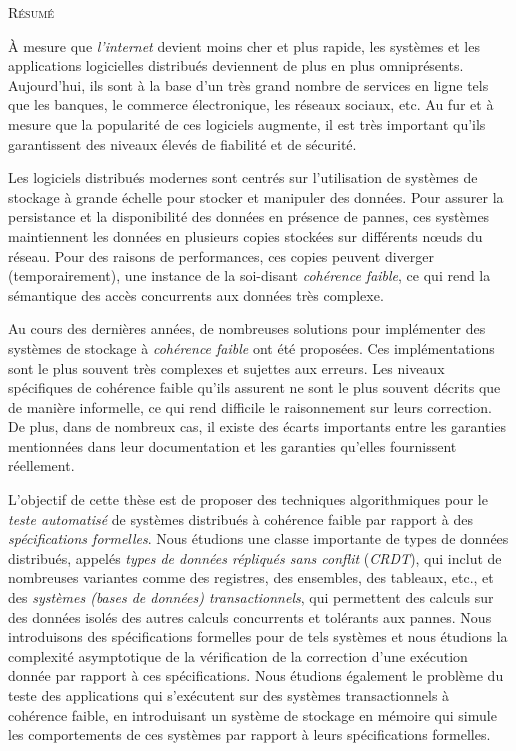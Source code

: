 
\begin{center}
  \textsc{Résumé}
\end{center}
%
\noindent
%


À mesure que \emph{l'internet} devient moins cher et plus rapide, les systèmes et les applications logicielles distribués deviennent de plus en plus omniprésents.
Aujourd'hui, ils sont à la base d'un très grand nombre de services en ligne tels que les banques, le commerce électronique, les réseaux sociaux, etc.
Au fur et à mesure que la popularité de ces logiciels augmente, il est très important qu'ils garantissent des niveaux élevés de fiabilité et de sécurité.

Les logiciels distribués modernes sont centrés sur l'utilisation de systèmes de stockage à grande échelle pour stocker et manipuler des données.
Pour assurer la persistance et la disponibilité des données en présence de pannes, ces systèmes maintiennent les données
en plusieurs copies stockées sur différents nœuds du réseau. Pour des raisons de performances, ces copies
peuvent diverger (temporairement), une instance de la soi-disant \emph{cohérence faible},
ce qui rend la sémantique des accès concurrents aux données très complexe.

Au cours des dernières années, de nombreuses solutions pour implémenter des systèmes de stockage à \emph{cohérence faible} ont été proposées.
Ces implémentations sont le plus souvent très complexes et sujettes aux erreurs.
Les niveaux spécifiques de cohérence faible qu'ils assurent ne sont le plus souvent décrits que de manière informelle, ce qui rend difficile le raisonnement sur leurs correction.
De plus, dans de nombreux cas, il existe des écarts importants entre les garanties mentionnées dans leur documentation et les garanties qu'elles fournissent réellement.

L'objectif de cette thèse est de proposer des techniques algorithmiques pour le \emph{teste automatisé} de systèmes distribués à cohérence faible par rapport à des \emph{spécifications formelles}. Nous étudions une classe importante de types de données distribués, appelés \emph{types de données répliqués sans conflit} (\emph{CRDT}), qui inclut de nombreuses variantes comme des registres, des ensembles, des tableaux, etc., et des \emph{systèmes (bases de données) transactionnels}, qui permettent des calculs sur des données isolés des autres calculs concurrents et tolérants aux pannes. Nous introduisons des spécifications formelles pour de tels systèmes et nous étudions la complexité asymptotique de la vérification de la correction d'une exécution donnée par rapport à ces spécifications. Nous étudions également le problème du teste des applications qui s'exécutent sur des systèmes transactionnels à cohérence faible, en introduisant un système de stockage en mémoire qui simule les comportements de ces systèmes par rapport à leurs spécifications formelles.

